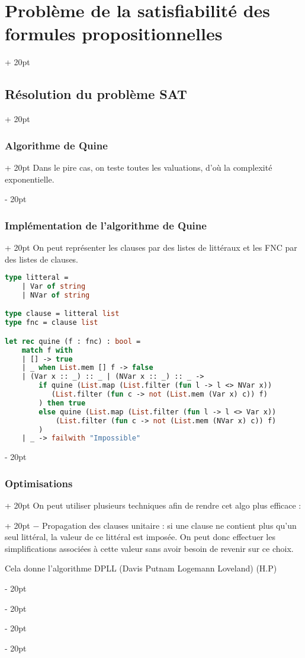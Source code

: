 \documentclass[a4paper, 12pt, twoside]{article}
\newcommand{\ind}[1][20pt]{\advance\leftskip + #1}
\newcommand{\deind}[1][20pt]{\advance\leftskip - #1}
\newenvironment{indt}[2][20pt]{#2 \par \ind[#1]}{\par \deind} %
\begin{document}
\begin{indt}{\section{Problème de la satisfiabilité des formules propositionnelles}}
\begin{indt}{\subsection{Résolution du problème SAT}}
\begin{indt}{\subsubsection{Algorithme de Quine}}
                Dans le pire cas, on teste toutes les valuations, d'où la complexité exponentielle.
            \end{indt}
            
            \vspace{12pt}
            
            \begin{indt}{\subsubsection{Implémentation de l'algorithme de Quine}}
                On peut représenter les clauses par des listes de littéraux et les FNC par des listes de clauses.
                
                \begin{lstlisting}[language=Caml, xleftmargin=80pt]
type litteral =
    | Var of string
    | NVar of string

type clause = litteral list
type fnc = clause list

let rec quine (f : fnc) : bool =
    match f with
    | [] -> true
    | _ when List.mem [] f -> false
    | (Var x :: _) :: _ | (NVar x :: _) :: _ ->
        if quine (List.map (List.filter (fun l -> l <> NVar x))
           (List.filter (fun c -> not (List.mem (Var x) c)) f)
        ) then true
        else quine (List.map (List.filter (fun l -> l <> Var x))
            (List.filter (fun c -> not (List.mem (NVar x) c)) f)
        )
    | _ -> failwith "Impossible"\end{lstlisting}
            \end{indt}
            
            \vspace{12pt}
            
            \begin{indt}{\subsubsection{Optimisations}}
                \begin{indt}{On peut utiliser plusieurs techniques afin de rendre cet algo plus efficace :}
                    $-$ Propagation des clauses unitaire : si une clause ne contient plus qu'un seul littéral, la valeur de ce littéral est imposée. On peut donc effectuer les simplifications associées à cette valeur sans avoir besoin de revenir sur ce choix.
                    
                    Cela donne l'algorithme DPLL (Davis Putnam Logemann Loveland) (H.P)
                    

\end{indt}
\end{indt}
\end{indt}
\end{indt}
\end{document}

